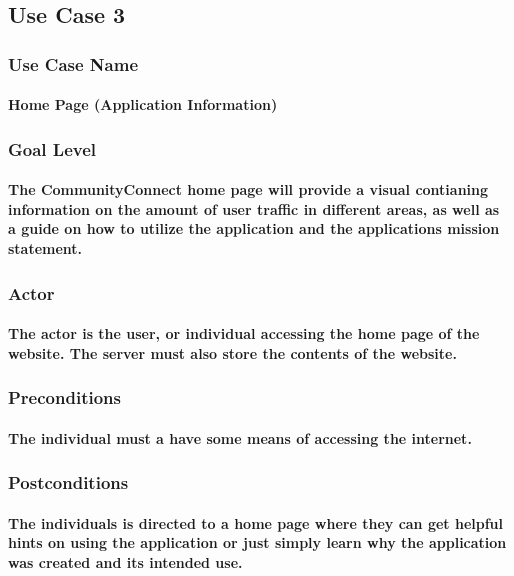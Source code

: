 \documentclass[12pt]{article}
\begin{document}
	\subsection{\bf Use Case 3}
		\subsubsection{Use Case Name}
			\paragraph{\normalfont Home Page (Application Information)
			}
		\subsubsection{Goal Level}
			\paragraph{\normalfont The CommunityConnect home page will provide a visual contianing information on the amount of user traffic in different areas, as well as a guide on how to utilize the application and the applications mission statement.
	  	}
		\subsubsection{Actor}
			\paragraph{\normalfont The actor is the user, or individual accessing the home page of the website. The server must also store the contents of the website.
			}
		\subsubsection{Preconditions}
			\paragraph{\normalfont The individual must a have some means of accessing the internet.
			}
  	\subsubsection{Postconditions}
			\paragraph{\normalfont The individuals is directed to a home page where they can get helpful hints on using the application or just simply learn why the application was created and its intended use.
			}
\end{document}
